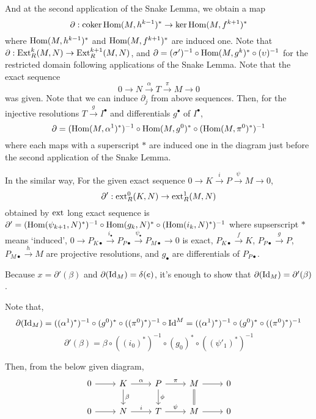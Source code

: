 And at the second application of the Snake Lemma,
we obtain a map
\[\partial: \textnormal{coker}\, \textnormal{Hom}(M, h^{k - 1})^* \to \ker \textnormal{Hom}(M, f^{k + 1})^*\]
where \(\textnormal{Hom}(M, h^{k - 1})^*\) and \(\textnormal{Hom}(M, f^{k + 1})^*\) are induced one.
Note that \(\partial: \textnormal{Ext}_R^k(M, N) \to \textnormal{Ext}_R^{k + 1}(M, N)\),
and \(\partial = (\sigma')^{-1} \circ \textnormal{Hom}(M, g^{k})^* \circ (\upsilon)^{-1}\)
for the restricted domain following applications of the Snake Lemma.
\br
\noindent
Note that the exact sequence
\[0 \to N \xrightarrow{\alpha} T \xrightarrow{\pi} M \to 0\]
was given.
Note that we can induce \(\partial_j\) from above sequences.
Then, for the injective resolutions
\(T \xrightarrow{g} I^\bullet\) and differentials \(g^\bullet\) of \(I^\bullet\),
\[\partial =
  (\textnormal{Hom}(M, \alpha^1)^*)^{-1} \circ \textnormal{Hom}(M, g^0)^* \circ (\textnormal{Hom}(M, \pi^0)^*)^{-1}\]
where each maps with a superscript \(*\) are induced one in the diagram just before the second application of the Snake Lemma.

\br\noindent
In the similar way,
For the given exact sequence \(0 \to K \xrightarrow{i} P \xrightarrow{\psi} M \to 0\),
\[\partial': \textnormal{ext}_R^0(K, N) \to \textnormal{ext}_R^1(M, N)\]
obtained by \(\textnormal{ext}\) long exact sequence is
\(\partial' = (\textnormal{Hom}(\psi_{k + 1}, N)^*)^{-1} \circ \textnormal{Hom}(g_k, N)^* \circ (\textnormal{Hom}(i_k, N)^*)^{-1}\)
where
supserscript \(*\) means `induced',
\(0 \to P_{K\bullet} \xrightarrow{i_\bullet} P_{P\bullet} \xrightarrow{\psi_\bullet} P_{M\bullet} \to 0\)
is exact,
\(P_{K\bullet} \xrightarrow{f} K\),
\(P_{P\bullet} \xrightarrow{g} P\),
\(P_{M\bullet} \xrightarrow{h} M\)
are projective resolutions,
and \(g_\bullet\) are differentials of \(P_{P\bullet}\).

\br\noindent
Because \(x = \partial'(\beta)\) and \(\partial(\textnormal{Id}_M) = \delta(e)\),
it's enough to show that \(\partial(\textnormal{Id}_M) = \partial'(\beta)\).

Note that,
\[\partial(\textnormal{Id}_M) =
  ((\alpha^1)^*)^{-1} \circ (g^0)^* \circ ((\pi^0)^*)^{-1} \circ \textnormal{Id}^M =
  ((\alpha^1)^*)^{-1} \circ (g^0)^* \circ ((\pi^0)^*)^{-1}\]
\[\partial'(\beta) =
  \beta \circ ((i_0)^*)^{-1} \circ (g_0)^* \circ ((\psi'_1)^*)^{-1}\]

Then, from the below given diagram,
\[\begin{tikzcd}
  0 \ar{r} & K \ar["\beta"]{d} \ar["\alpha"]{r} & P \ar["\phi"]{d} \ar["\pi"]{r} & M \ar[equal]{d} \ar{r} & 0 \\
  0 \ar{r} & N \ar["i"]{r} & T \ar["\psi"]{r} & M \ar{r} & 0
\end{tikzcd}\]

